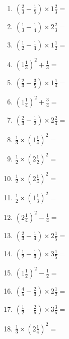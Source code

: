 \documentclass[12pt]{article}
\begin{document}
\begin{enumerate}
\item \large $ \left( \frac{2}{3} - \frac{1}{5} \right) \times 1 \frac{2}{3} = $ \vspace{1.6cm}
\item \large $ \left( \frac{1}{3} - \frac{1}{4} \right) \times 2 \frac{2}{3} = $ \vspace{1.6cm}
\item \large $ \left( \frac{1}{2} - \frac{1}{4} \right) \times 1 \frac{1}{2} = $ \vspace{1.6cm}
\item \large $ \left( 1 \frac{1}{3} \right)^2 + \frac{1}{3} = $ \vspace{1.6cm}
\item \large $ \left( \frac{2}{3} - \frac{3}{5} \right) \times 1 \frac{1}{4} = $ \vspace{1.6cm}
\item \large $ \left( 1 \frac{1}{4} \right)^2 + \frac{3}{4} = $ \vspace{1.6cm}
\item \large $ \left( \frac{2}{3} - \frac{1}{2} \right) \times 2 \frac{2}{4} = $ \vspace{1.6cm}
\item \large $ \frac{1}{3} \times \left( 1 \frac{1}{4} \right)^2 = $ \vspace{1.6cm}
\newpage
\item \large $ \frac{1}{2} \times \left( 2 \frac{1}{2} \right)^2 = $ \vspace{1.6cm}
\item \large $ \frac{1}{2} \times \left( 2 \frac{1}{4} \right)^2 = $ \vspace{1.6cm}
\item \large $ \frac{1}{2} \times \left( 1 \frac{1}{3} \right)^2 = $ \vspace{1.6cm}
\item \large $ \left( 2 \frac{1}{4} \right)^2 - \frac{1}{4} = $ \vspace{1.6cm}
\item \large $ \left( \frac{2}{3} - \frac{1}{4} \right) \times 2 \frac{1}{5} = $ \vspace{1.6cm}
\item \large $ \left( \frac{1}{2} - \frac{1}{3} \right) \times 3 \frac{1}{5} = $ \vspace{1.6cm}
\item \large $ \left( 1 \frac{1}{2} \right)^2 - \frac{1}{2} = $ \vspace{1.6cm}
\item \large $ \left( \frac{4}{5} - \frac{2}{3} \right) \times 2 \frac{1}{2} = $ \vspace{1.6cm}
\item \large $ \left( \frac{1}{2} - \frac{2}{5} \right) \times 3 \frac{3}{5} = $ \vspace{1.6cm}
\item \large $ \frac{1}{3} \times \left( 2 \frac{1}{4} \right)^2 = $ \vspace{1.6cm}
\end{enumerate}\newpage
\end{document}
